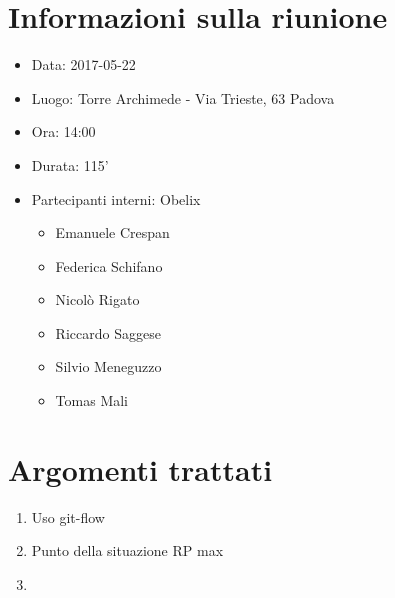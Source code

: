 \documentclass[10 pt,a4paper, openany]{article}
\date{}
\begin{document}
\paginatitolo
\section{Informazioni sulla riunione}

\begin{itemize}
\item[] Data: 2017-05-22
\item[] Luogo: Torre Archimede - Via Trieste, 63 Padova
\item[] Ora: 14:00
\item[] Durata: 115'
\item[] Partecipanti interni: Obelix
  \begin{itemize}
  \item[] Emanuele Crespan
  \item[] Federica Schifano
  \item[] Nicolò Rigato
  \item[] Riccardo Saggese
  \item[] Silvio Meneguzzo
  \item[] Tomas Mali
 \end{itemize}
\end{itemize}

\section{Argomenti trattati}
\begin{enumerate}
	\item Uso git-flow	
	\item Punto della situazione RP max
	\item 

	
\end{enumerate}
\end{document}
